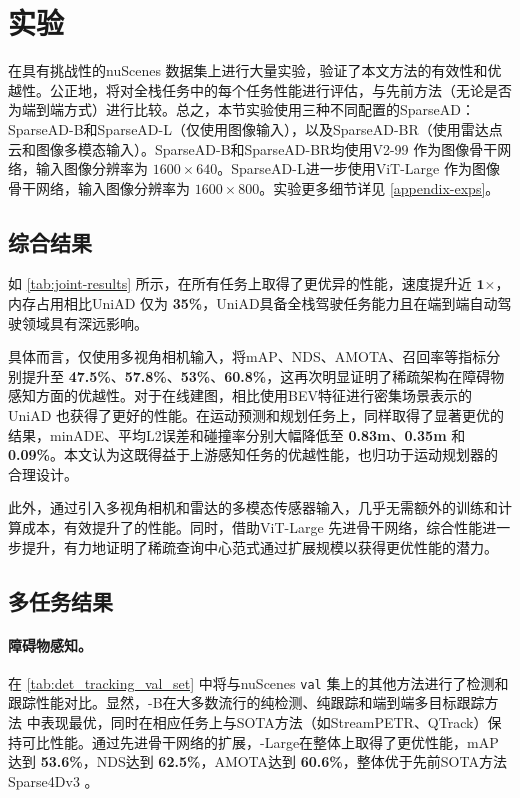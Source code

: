 \section{实验}
\label{sec:experiments}

在具有挑战性的nuScenes \cite{caesar2020nuscenes} 数据集上进行大量实验，验证了本文方法的有效性和优越性。公正地，将对全栈任务中的每个任务性能进行评估，与先前方法（无论是否为端到端方式）进行比较。总之，本节实验使用三种不同配置的SparseAD：SparseAD-B和SparseAD-L（仅使用图像输入），以及SparseAD-BR（使用雷达点云和图像多模态输入）。SparseAD-B和SparseAD-BR均使用V2-99\cite{lee2020centermask} 作为图像骨干网络，输入图像分辨率为 $1600\times640$。SparseAD-L进一步使用ViT-Large\cite{dosovitskiy2020image} 作为图像骨干网络，输入图像分辨率为 $1600\times800$。实验更多细节详见 \cref{appendix-exps}。

\subsection{综合结果}


如 \cref{tab:joint-results} 所示，\model 在所有任务上取得了更优异的性能，速度提升近 $\mathbf{1 \boldsymbol{\times}}$，内存占用相比UniAD \cite{hu2023planning} 仅为 \textbf{35\%}，UniAD具备全栈驾驶任务能力且在端到端自动驾驶领域具有深远影响。

具体而言，仅使用多视角相机输入，将mAP、NDS、AMOTA、召回率等指标分别提升至 \textbf{47.5\%}、\textbf{57.8\%}、\textbf{53\%}、\textbf{60.8\%}，这再次明显证明了稀疏架构在障碍物感知方面的优越性。对于在线建图，\model 相比使用BEV特征进行密集场景表示的UniAD \cite{hu2023planning} 也获得了更好的性能。在运动预测和规划任务上，\model 同样取得了显著更优的结果，minADE、平均L2误差和碰撞率分别大幅降低至 \textbf{0.83m}、\textbf{0.35m} 和 \textbf{0.09\%}。本文认为这既得益于上游感知任务的优越性能，也归功于运动规划器的合理设计。

此外，通过引入多视角相机和雷达的多模态传感器输入，几乎无需额外的训练和计算成本，有效提升了\model 的性能。同时，借助ViT-Large\cite{dosovitskiy2020image} 先进骨干网络，综合性能进一步提升，有力地证明了稀疏查询中心范式通过扩展规模以获得更优性能的潜力。

\subsection{多任务结果}


\paragraph{\textbf{障碍物感知。}}
在 \cref{tab:det_tracking_val_set} 中将\model 与nuScenes \texttt{val} 集上的其他方法进行了检测和跟踪性能对比。显然，\model-B在大多数流行的纯检测、纯跟踪和端到端多目标跟踪方法 \cite{li2023bevdepth, li2022bevformer, pang2023standing,zhang2022mutr3d} 中表现最优，同时在相应任务上与SOTA方法（如StreamPETR\cite{wang2023exploring}、QTrack\cite{yang2022quality}）保持可比性能。通过先进骨干网络的扩展，\model-Large在整体上取得了更优性能，mAP达到 \textbf{53.6\%}，NDS达到 \textbf{62.5\%}，AMOTA达到 \textbf{60.6\%}，整体优于先前SOTA方法Sparse4Dv3 \cite{lin2023sparse4d}。

